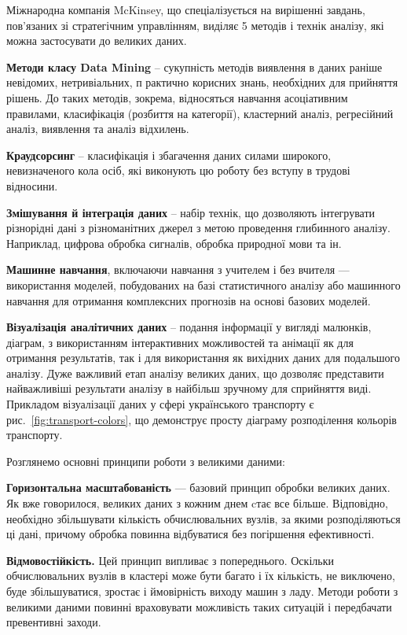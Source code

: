 Міжнародна компанія McKinsey,
що спеціалізується на вирішенні завдань,
пов'язаних зі стратегічним управлінням,
виділяє 5 методів і технік аналізу,
які можна застосувати до великих даних.

\textbf{Методи класу Data Mining} – сукупність методів виявлення в даних раніше невідомих, нетривіальних, п
рактично корисних знань, необхідних для прийняття рішень.
До таких методів, зокрема, відносяться навчання асоціативним правилами,
класифікація (розбиття на категорії), кластерний аналіз, регресійний аналіз,
виявлення та аналіз відхилень.

\textbf{Краудсорсинг} – класифікація і збагачення даних силами широкого,
невизначеного кола осіб,
які виконують цю роботу без вступу в трудові відносини.

\textbf{Змішування й інтеграція даних} – набір технік, що дозволяють інтегрувати різнорідні дані з
різноманітних джерел з метою проведення глибинного аналізу.
Наприклад, цифрова обробка сигналів, обробка природної мови та ін.

\textbf{Машинне навчання}, включаючи навчання з учителем і без вчителя —
використання моделей, побудованих на базі статистичного аналізу або машинного навчання для
отримання комплексних прогнозів на основі базових моделей.

\textbf{Візуалізація аналітичних даних} – подання інформації у вигляді малюнків, діаграм,
з використанням інтерактивних можливостей та анімації як для отримання результатів,
так і для використання як вихідних даних для подальшого аналізу.
Дуже важливий етап аналізу великих даних,
що дозволяє представити найважливіші результати аналізу в найбільш зручному для сприйняття виді.
Прикладом візуалізації даних у сфері українського транспорту є рис.~\ref{fig:transport-colors},
що демонструє просту діаграму розподілення кольорів транспорту.

Розглянемо основні принципи роботи з великими даними:

\textbf{Горизонтальна масштабованість} — базовий принцип обробки великих даних.
Як вже говорилося, великих даних з кожним днем cтає все більше.
Відповідно, необхідно збільшувати кількість обчислювальних вузлів,
за якими розподіляються ці дані,
причому обробка повинна відбуватися без погіршення ефективності.

\textbf{Відмовостійкість.} Цей принцип випливає з попереднього.
Оскільки обчислювальних вузлів в кластері може бути багато і їх кількість,
не виключено, буде збільшуватися, зростає і ймовірність виходу машин з ладу.
Методи роботи з великими даними повинні враховувати можливість
таких ситуацій і передбачати превентивні заходи.

